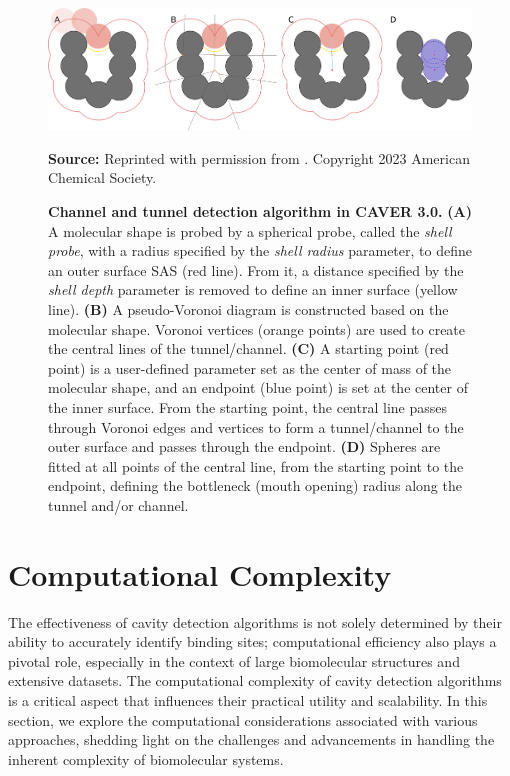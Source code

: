 \documentclass[Ingles]{phdthesis}
\begin{document}
\begin{figure}[H]
  \centerline{\includegraphics[scale=1.1]{images/caver-schema.png}}
  \centerline{\tiny{\textbf{Source:} Reprinted with permission from \cite{guerra2023B}. Copyright 2023 American Chemical Society.}}
  \caption[Channel and tunnel detection algorithm in CAVER 3.0]{\textbf{Channel and tunnel detection algorithm in CAVER 3.0.} \textbf{(A)} A molecular shape is probed by a spherical probe, called the \textit{shell probe}, with a radius specified by the \textit{shell radius} parameter, to define an outer surface SAS (red line). From it, a distance specified by the \textit{shell depth} parameter is removed to define an inner surface (yellow line). \textbf{(B)} A pseudo-Voronoi diagram is constructed based on the molecular shape. Voronoi vertices (orange points) are used to create the central lines of the tunnel/channel. \textbf{(C)} A starting point (red point) is a user-defined parameter set as the center of mass of the molecular shape, and an endpoint (blue point) is set at the center of the inner surface. From the starting point, the central line passes through Voronoi edges and vertices to form a tunnel/channel to the outer surface and passes through the endpoint. \textbf{(D)} Spheres are fitted at all points of the central line, from the starting point to the endpoint, defining the bottleneck (mouth opening) radius along the tunnel and/or channel.}
  \label{fig:caver-schema}
\end{figure}

\section{Computational Complexity \label{sec:computational-complexity}}

The effectiveness of cavity detection algorithms is not solely determined by their ability to accurately identify binding sites; computational efficiency also plays a pivotal role, especially in the context of large biomolecular structures and extensive datasets. The computational complexity of cavity detection algorithms is a critical aspect that influences their practical utility and scalability. In this section, we explore the computational considerations associated with various approaches, shedding light on the challenges and advancements in handling the inherent complexity of biomolecular systems.
\end{document}
